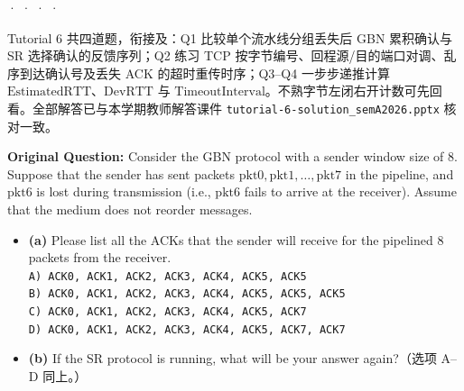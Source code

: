 

 ·  ·  ·  · 


Tutorial 6 共四道题，衔接及：Q1 比较单个流水线分组丢失后 GBN 累积确认与 SR 选择确认的反馈序列；Q2 练习 TCP 按字节编号、回程源/目的端口对调、乱序到达确认号及丢失 ACK 的超时重传时序；Q3–Q4 一步步递推计算 $\mathrm{EstimatedRTT}$、$\mathrm{DevRTT}$ 与 $\mathrm{TimeoutInterval}$。不熟字节左闭右开计数可先回看。全部解答已与本学期教师解答课件 \texttt{tutorial-6-solution\_semA2026.pptx} 核对一致。



\textbf{Original Question:} Consider the GBN protocol with a sender window size of 8. Suppose that the sender has sent packets $\mathrm{pkt0}, \mathrm{pkt1}, \dots, \mathrm{pkt7}$ in the pipeline, and $\mathrm{pkt6}$ is lost during transmission (i.e., $\mathrm{pkt6}$ fails to arrive at the receiver). Assume that the medium does not reorder messages.
\begin{itemize}
\item \textbf{(a)} Please list all the ACKs that the sender will receive for the pipelined 8 packets from the receiver. \\
\texttt{A) ACK0, ACK1, ACK2, ACK3, ACK4, ACK5, ACK5} \\
\texttt{B) ACK0, ACK1, ACK2, ACK3, ACK4, ACK5, ACK5, ACK5} \\
\texttt{C) ACK0, ACK1, ACK2, ACK3, ACK4, ACK5, ACK7} \\
\texttt{D) ACK0, ACK1, ACK2, ACK3, ACK4, ACK5, ACK7, ACK7}
\item \textbf{(b)} If the SR protocol is running, what will be your answer again?（选项 A–D 同上。）
\end{itemize}


